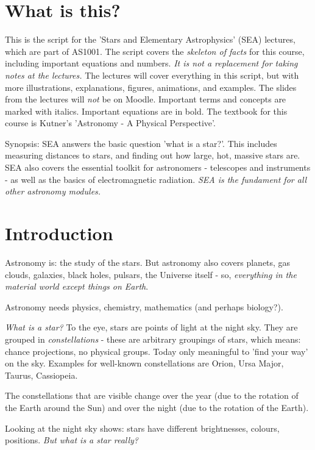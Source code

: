 \section{What is this?}

This is the script for the 'Stars and Elementary Astrophysics' (SEA) lectures, which are part of AS1001. The script covers the \textit{skeleton of facts} for this course, including important equations and numbers. \textit{It is not a replacement for taking notes at the lectures.} The lectures will cover everything in this script, but with more illustrations, explanations, figures, animations, and examples. The slides from the lectures will \textit{not} be on Moodle. Important terms and concepts are marked with italics. Important equations are in bold. The textbook for this course is Kutner's 'Astronomy - A Physical Perspective'. 

Synopsis: SEA answers the basic question 'what is a star?'. This includes measuring distances to stars, and finding out how large, hot, massive stars are. SEA also covers the essential toolkit for astronomers - telescopes and instruments - as well as the basics of electromagnetic radiation. \textit{SEA is the fundament for all other astronomy modules.}

\section{Introduction}

Astronomy is: the study of the stars. But astronomy also covers planets, gas clouds, galaxies, black holes, pulsars, the Universe itself - so, \textit{everything in the material world except things on Earth}.

Astronomy needs physics, chemistry, mathematics (and perhaps biology?).

\textit{What is a star?} To the eye, stars are points of light at the night sky. They are grouped in \textit{constellations} - these are arbitrary groupings of stars, which means: chance projections, no physical groups. Today only meaningful to 'find your way' on the sky. Examples for well-known constellations are Orion, Ursa Major, Taurus, Cassiopeia. 

The constellations that are visible change over the year (due to the rotation of the Earth around the Sun) and over the night (due to the rotation of the Earth). 

Looking at the night sky shows: stars have different brightnesses, colours, positions. \textit{But what is a star really?}

